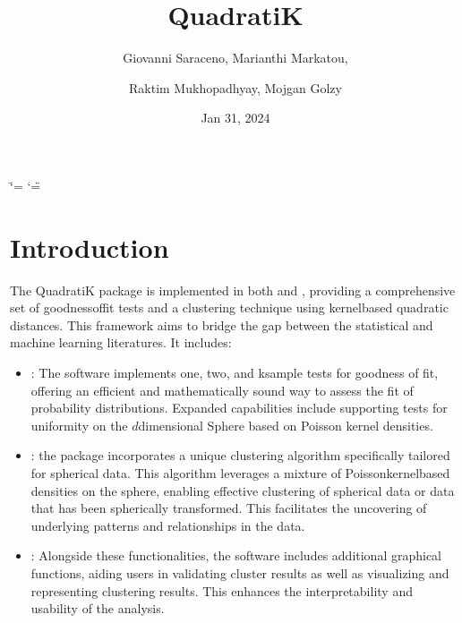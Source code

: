 \documentclass[letterpaper,10pt,english,openany,oneside]{sphinxmanual}
\title{QuadratiK}
\date{Jan 31, 2024}
\author{Giovanni Saraceno, Marianthi Markatou, \and Raktim Mukhopadhyay, Mojgan Golzy}
\begin{document}
\ifdefined\shorthandoff
  \ifnum\catcode`\=\string=\active\shorthandoff{=}\fi
  \ifnum\catcode`\"=\active{}\fi
\fi

\pagestyle{empty}
\sphinxmaketitle
\pagestyle{plain}
\sphinxtableofcontents
\pagestyle{normal}
\label{\detokenize{index::doc}}



\chapter{Introduction}
\label{\detokenize{index:introduction}}
\sphinxAtStartPar
The QuadratiK package is implemented in both  and , providing a comprehensive set of goodness\sphinxhyphen{}of\sphinxhyphen{}fit tests and a clustering technique using kernel\sphinxhyphen{}based quadratic distances. This framework aims to bridge the gap between the statistical and machine learning literatures. It includes:
\begin{itemize}
\item {} 
\sphinxAtStartPar
{} : The software implements one, two, and k\sphinxhyphen{}sample tests for goodness of fit, offering an efficient and mathematically sound way to assess the fit of probability distributions. Expanded capabilities include supporting tests for uniformity on the \(d\)\sphinxhyphen{}dimensional Sphere based on Poisson kernel densities.

\item {} 
\sphinxAtStartPar
{}: the package incorporates a unique clustering algorithm specifically tailored for spherical data. This algorithm leverages a mixture of Poisson\sphinxhyphen{}kernel\sphinxhyphen{}based densities on the sphere, enabling effective clustering of spherical data or data that has been spherically transformed. This facilitates the uncovering of underlying patterns and relationships in the data.

\item {} 
\sphinxAtStartPar
{}: Alongside these functionalities, the software includes additional graphical functions, aiding users in validating cluster results as well as visualizing and representing clustering results. This enhances the interpretability and usability of the analysis.

\end{itemize}
\end{document}

